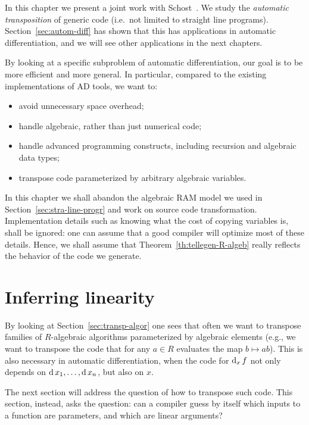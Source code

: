 

In this chapter we present a joint work with
Schost~\cite{df+schost10}. We study the
\emph{automatic transposition} of
generic code (i.e.\ not limited to straight line programs).
Section~\ref{sec:autom-diff} has shown that this has applications in
automatic differentiation, and we will see other applications in the
next chapters.

By looking at a specific subproblem of automatic differentiation, our
goal is to be more efficient and more general. In particular, compared
to the existing implementations of AD tools, we want to:
\begin{itemize}
\item avoid unnecessary space overhead;
\item handle algebraic, rather than just numerical code;
\item handle advanced programming constructs, including recursion and
  algebraic data types;
\item transpose code parameterized by arbitrary algebraic variables.
\end{itemize}

In this chapter we shall abandon the algebraic RAM model we used in
Section~\ref{sec:stra-line-progr} and work on source code
transformation. Implementation details such as knowing what the cost
of copying variables is, shall be ignored: one can assume that a good
compiler will optimize most of these details. Hence, we shall assume
that Theorem~\ref{th:tellegen-R-algeb} really reflects the behavior of
the code we generate.


\section{Inferring linearity}
\label{sec:inference}
\lstset{language=haskell}

By looking at Section~\ref{sec:transp-algor} one sees that often we
want to transpose families of $R$-algebraic algorithms parameterized
by algebraic elements (e.g., we want to transpose the code that for
any $a\in R$ evaluates the map $b\mapsto ab$). This is also necessary
in automatic differentiation, when the code for $\operatorname{d}_x f$ not only
depends on $\operatorname{d} x_1,\ldots,\operatorname{d} x_n$, but also on $x$.

The next section will address the question of how to transpose such
code. This section, instead, asks the question: can a compiler guess
by itself which inputs to a function are parameters, and which are
linear arguments?

